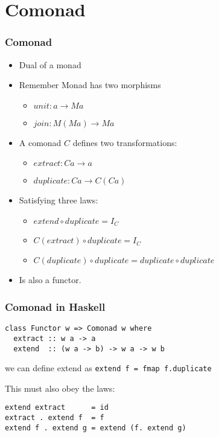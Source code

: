 \documentclass{beamer} %
\begin{document}
\section{Comonad}

\begin{frame}[fragile]\frametitle{Comonad}
  \begin{itemize}
    \item Dual of a monad


    \item Remember Monad has two morphisms
      \begin{itemize}
        \item $\mathit{unit} : a \rightarrow M a$
        \item $\mathit{join} : M (M a) \rightarrow M a$
      \end{itemize}

    \item A comonad $C$ defines two transformations:
      \begin{itemize}
        \item $\mathit{extract} : C a \rightarrow a$ 

        \item $\mathit{duplicate}  : C a \rightarrow C (C a)$
      \end{itemize}
    \item Satisfying three laws:
      \begin{itemize}
        \item $\mathit{extend} \circ \mathit{duplicate} = I_C$
        \item $C(\mathit{extract}) \circ \mathit{duplicate} = I_C$
        \item $C(\mathit{duplicate}) \circ \mathit{duplicate} = \mathit{duplicate}
          \circ \mathit{duplicate}$
      \end{itemize}
    \item Is also a functor.
  \end{itemize}
\end{frame}

\begin{frame}[fragile]\frametitle{Comonad in Haskell}
\begin{verbatim}
class Functor w => Comonad w where
  extract :: w a -> a
  extend  :: (w a -> b) -> w a -> w b
\end{verbatim}
we can define extend as \texttt{extend f = fmap f.duplicate}

This must also obey the laws:
\begin{verbatim}
extend extract      = id
extract . extend f  = f
extend f . extend g = extend (f. extend g)
\end{verbatim}
\end{frame}
\end{document}
